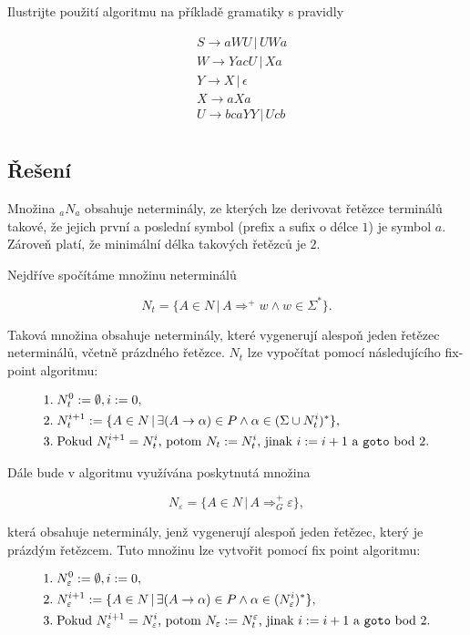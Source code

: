 \documentclass[a4paper, 12pt]{article}
\theoremstyle{definition}
\theoremstyle{definition}
\theoremstyle{definition}
\theoremstyle{remark}
\begin{document}
Ilustrijte použití algoritmu na příkladě gramatiky s pravidly

\begin{align*}
    &S \rightarrow aWU \, | \, UWa \\
    &W \rightarrow YacU \, | \, Xa  \\ 
    &Y \rightarrow X \, | \, \epsilon \\
    &X \rightarrow aXa \\
    &U \rightarrow bcaYY \, | \, Ucb \\
\end{align*}

\subsection{Řešení}
Množina ${}_{a}N_{a}$ obsahuje neterminály, ze kterých lze derivovat řetězce terminálů takové, že jejich první a poslední symbol (prefix a sufix o délce $1$) je symbol $a$. Zároveň platí, že minimální délka takových řetězců je $2$.

Nejdříve spočítáme množinu neterminálů

$$N_t = \{A \in N \, | \, A \Rightarrow^+ w \wedge w \in \Sigma^\ast\}.$$

\noindent
Taková množina obsahuje neterminály, které vygenerují alespoň jeden řetězec neterminálů, včetně prázdného řetězce. $N_t$ lze vypočítat pomocí následujícího fix-point algoritmu:

\begin{align*}
    &1. \; N_t^0 := \emptyset, i := 0, \\
    &2. \; N_t^{i+1} := \{A \in N \, | \, \exists (A \rightarrow \alpha) \in P \wedge \alpha \in (\Sigma \cup N_t^i)^\ast\}, \\
    &3. \; \text{Pokud } N_t^{i+1} = N_t^i \text{, potom } N_t := N_t^i \text{, jinak } i := i+1 \text{ a \texttt{goto} bod 2}.
\end{align*}

Dále bude v algoritmu využívána poskytnutá množina

$$N_{\varepsilon} = \{A \in N \, | \, A \Rightarrow_G^+ \varepsilon\},$$

\noindent
která obsahuje neterminály, jenž vygenerují alespoň jeden řetězec, který je prázdým řetězcem. Tuto množinu lze vytvořit pomocí fix point algoritmu:

\begin{align*}
    &1. \; N_\varepsilon^0 := \emptyset, i := 0, \\
    &2. \; N_\varepsilon^{i+1} := \{A \in N \, | \, \exists (A \rightarrow \alpha) \in P \wedge \alpha \in (N_\varepsilon^i)^\ast\}, \\
    &3. \; \text{Pokud } N_\varepsilon^{i+1} = N_\varepsilon^i \text{, potom } N_\varepsilon := N_t^\varepsilon \text{, jinak } i := i+1 \text{ a \texttt{goto} bod 2}.
\end{align*}
\end{document}
